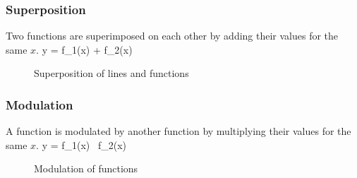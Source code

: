 \subsubsection{Superposition}
Two functions are superimposed on each other by adding their values for the same $x$.
\bnn y = f_1(x) + f_2(x) \enn
\vspace*{-.5cm} \begin{figure}[!h]
    \centering
    \hspace{0.5cm}
     \svs
    \caption{Superposition of lines and functions} \label{fig17}
\end{figure}

\subsubsection{Modulation}
A function is modulated by another function by multiplying their values for the same $x$. 
\bnn y = f_1(x) \, f_2(x) \enn

\vs\begin{figure}[!h]
    \centering
    \hspace{0.5cm}
      \svs
    \caption{Modulation of functions} \label{fig19}
\end{figure}

\newpage